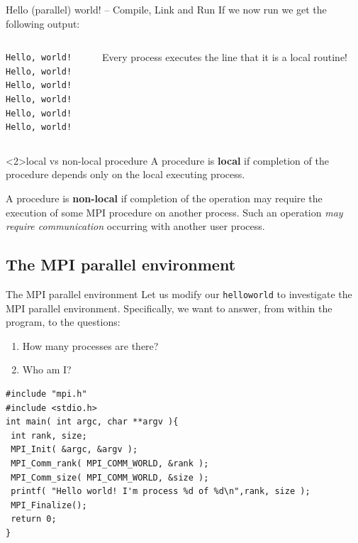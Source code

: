 \documentclass{beamer}
\begin{document}
\begin{frame}[fragile]{Hello (parallel) world! -- Compile, Link and Run}
If we now run
we get the following output:
\begin{columns}
\begin{column}{0.4\columnwidth}
\begin{verbatim}
Hello, world!
Hello, world!
Hello, world!
Hello, world!
Hello, world!
Hello, world!
\end{verbatim}
\end{column}
\begin{column}{0.6\columnwidth}
Every process executes the line  that it is a \alert{local} routine!
\end{column}
\end{columns}
\begin{block}<2>{local vs non-local procedure}
	A procedure is \textbf{local} if completion of the procedure depends only on the local executing process.
	
	A procedure is \textbf{non-local} if completion of the operation may require the execution of some MPI procedure on another process. Such an operation \emph{may require
	communication} occurring with another user process.
\end{block}
\end{frame}

\subsection{The MPI parallel environment}
\begin{frame}[fragile]{The MPI parallel environment}
Let us modify our \texttt{helloworld} to investigate the MPI parallel environment. Specifically, we want to answer, from within the program, to the questions:
\begin{enumerate} 
	\item How many processes are there?
	\item Who am I?
\end{enumerate}
\begin{verbatim}
#include "mpi.h"
#include <stdio.h>
int main( int argc, char **argv ){
 int rank, size;
 MPI_Init( &argc, &argv );
 MPI_Comm_rank( MPI_COMM_WORLD, &rank );
 MPI_Comm_size( MPI_COMM_WORLD, &size );
 printf( "Hello world! I'm process %d of %d\n",rank, size );
 MPI_Finalize();
 return 0;
}
\end{verbatim}
\end{frame}
\end{document}
